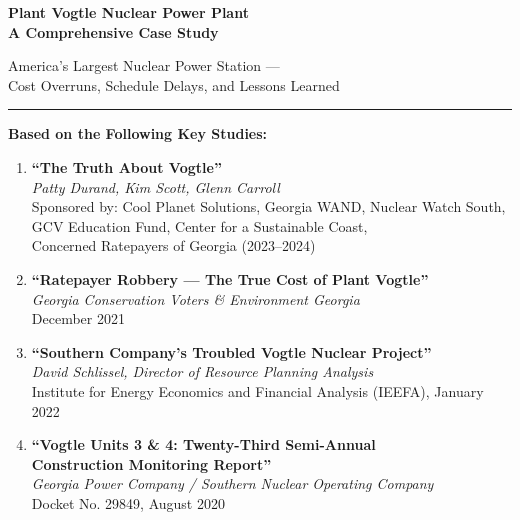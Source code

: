 \documentclass[12pt,a4paper]{article}
\begin{document}
\begin{titlepage}
\centering
\vspace*{2cm}

{\Huge\bfseries\color{nuclearblue}
Plant Vogtle Nuclear Power Plant\\[0.5em]
A Comprehensive Case Study}

\vspace{1em}
{\large\color{gray} America's Largest Nuclear Power Station ---\\
Cost Overruns, Schedule Delays, and Lessons Learned}

\vspace{2em}
\rule{0.8\textwidth}{1pt}

\vspace{2em}
{\large\bfseries Based on the Following Key Studies:}

\vspace{1em}
\begin{mdframed}[backgroundcolor=lightgray, linecolor=nuclearblue, linewidth=1pt]
\begin{enumerate}[leftmargin=1.5em, label=\textbf{\arabic*.}]
    \item \textbf{``The Truth About Vogtle''} \\
          \textit{Patty Durand, Kim Scott, Glenn Carroll} \\
          Sponsored by: Cool Planet Solutions, Georgia WAND, Nuclear Watch South, \\
          GCV Education Fund, Center for a Sustainable Coast, \\
          Concerned Ratepayers of Georgia (2023--2024)

    \item \textbf{``Ratepayer Robbery --- The True Cost of Plant Vogtle''} \\
          \textit{Georgia Conservation Voters \& Environment Georgia} \\
          December 2021

    \item \textbf{``Southern Company's Troubled Vogtle Nuclear Project''} \\
          \textit{David Schlissel, Director of Resource Planning Analysis} \\
          Institute for Energy Economics and Financial Analysis (IEEFA), January 2022

    \item \textbf{``Vogtle Units 3 \& 4: Twenty-Third Semi-Annual \\
          Construction Monitoring Report''} \\
          \textit{Georgia Power Company / Southern Nuclear Operating Company} \\
          Docket No. 29849, August 2020


\end{enumerate}
\end{mdframed}
\end{titlepage}
\end{document}
